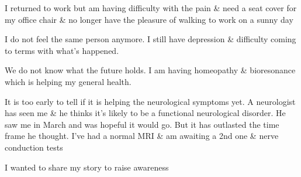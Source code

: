 I returned to work but am having difficulty with the pain \& need a seat cover
for my office chair \& no longer have the pleasure of walking to work on a sunny
day

I do not feel the same person anymore. I still have depression \& difficulty
coming to terms with what’s happened.

We do not know what the future holds. I am having homeopathy \& bioresonance
which is helping my general health.

It is too early to tell if it is helping the neurological symptoms yet. A
neurologist has seen me \& he thinks it’s likely to be a functional neurological
disorder. He saw me in March and was hopeful it would go. But it has outlasted
the time frame he thought. I’ve had a normal MRI \& am awaiting a 2nd one \&
nerve conduction tests

I wanted to share my story to raise awareness

